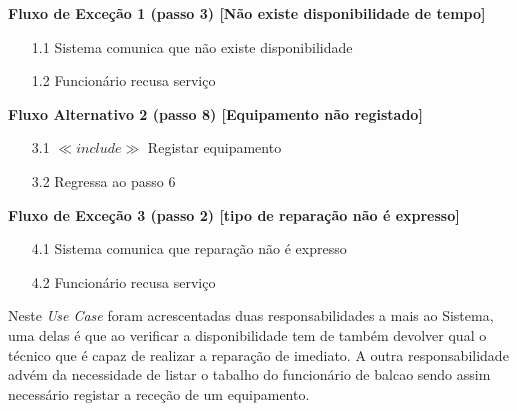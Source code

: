\documentclass[../relatorio.tex]{subfiles}
\begin{document}
\begin{itemize}
          \begin{flushleft}
              \textbf{Fluxo de Exceção 1 (passo 3) [Não existe disponibilidade de tempo]}
          \end{flushleft}
          \begin{itemize}
              \item[1.1]{Sistema comunica que não existe disponibilidade}
              \item[1.2]{Funcionário recusa serviço}
          \end{itemize}
          \begin{flushleft}
              \textbf{Fluxo Alternativo 2 (passo 8) [Equipamento não registado]}
          \end{flushleft}
          \begin{itemize}
              \item[3.1] $\ll include \gg$ Registar equipamento
              \item[3.2] Regressa ao passo 6
          \end{itemize}
          \begin{flushleft}
              \textbf{Fluxo de Exceção 3 (passo 2) [tipo de reparação não é expresso]}
          \end{flushleft}
          \begin{itemize}
              \item[4.1]{Sistema comunica que reparação não é expresso}
              \item[4.2]{Funcionário recusa serviço}
          \end{itemize}
\end{itemize}
Neste \textit{Use Case} foram acrescentadas duas responsabilidades a mais ao Sistema, uma delas é que ao verificar a disponibilidade
tem de também devolver qual o técnico que é capaz de realizar a reparação de imediato. A outra responsabilidade advém da necessidade de listar
o tabalho do funcionário de balcao sendo assim necessário registar a receção de um equipamento.
\end{document}
